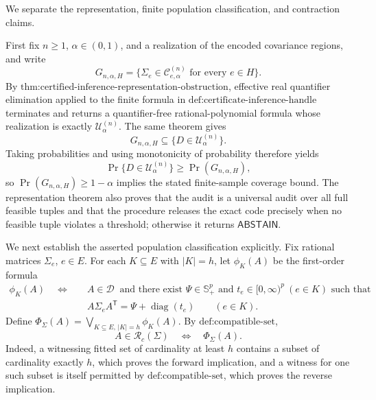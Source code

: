 We separate the representation, finite population classification, and contraction claims.

First fix \(n\geq 1\), \(\alpha\in(0,1)\), and a realization of the encoded covariance regions, and write
\[
G_{n,\alpha,H}
=\{\Sigma_e\in\mathcal C^{(n)}_{e,\alpha}\text{ for every }e\in H\}.
\]
By \(\text{thm:certified-inference-representation-obstruction}\), effective real quantifier elimination applied to the finite formula in \(\text{def:certificate-inference-handle}\) terminates and returns a quantifier-free rational-polynomial formula whose realization is exactly \(\mathcal U^{(n)}_\alpha\).  The same theorem gives
\[
G_{n,\alpha,H}\subseteq\{D\in\mathcal U^{(n)}_\alpha\}.
\]
Taking probabilities and using monotonicity of probability therefore yields
\[
\Pr\{D\in\mathcal U^{(n)}_\alpha\}
\geq \Pr(G_{n,\alpha,H}),
\]
so \(\Pr(G_{n,\alpha,H})\geq1-\alpha\) implies the stated finite-sample coverage bound.  The representation theorem also proves that the audit is a universal audit over all full feasible tuples and that the procedure releases the exact code precisely when no feasible tuple violates a threshold; otherwise it returns \(\mathsf{ABSTAIN}\).

We next establish the asserted population classification explicitly.  Fix rational matrices \(\Sigma_e\), \(e\in E\).  For each \(K\subseteq E\) with \(|K|=h\), let \(\phi_K(A)\) be the first-order formula
\[
\begin{split}
\phi_K(A)\quad\Longleftrightarrow\quad
&A\in\mathcal D\ \text{ and there exist }\Psi\in\mathbb S_+^p
\text{ and }t_e\in[0,\infty)^p\ (e\in K)\text{ such that}\\
&A\Sigma_eA^{\mathsf T}=\Psi+\operatorname{diag}(t_e)
\qquad(e\in K).
\end{split}
\]
Define \(\Phi_\Sigma(A)=\bigvee_{K\subseteq E,\,|K|=h}\phi_K(A)\).  By \(\text{def:compatible-set}\),
\[
A\in\mathcal R_c(\Sigma)\quad\Longleftrightarrow\quad\Phi_\Sigma(A).
\]
Indeed, a witnessing fitted set of cardinality at least \(h\) contains a subset of cardinality exactly \(h\), which proves the forward implication, and a witness for one such subset is itself permitted by \(\text{def:compatible-set}\), which proves the reverse implication.

